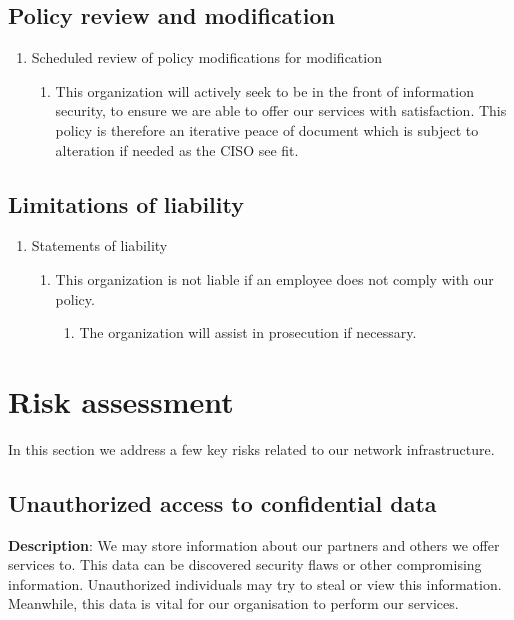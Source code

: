 \subsection{Policy review and modification}

\begin{enumerate}
  \item Scheduled review of policy modifications for modification
  \begin{enumerate}
    \item This organization will actively seek to be in the front of information security, to ensure we are able to offer our services with satisfaction. This policy is therefore an iterative peace of document which is subject to alteration if needed as the CISO see fit.
  \end{enumerate}
\end{enumerate}

\subsection{Limitations of liability}

\begin{enumerate}
  \item Statements of liability
  \begin{enumerate}
    \item This organization is not liable if an employee does not comply with our policy.
    \begin{enumerate}
      \item The organization will assist in prosecution if necessary.
    \end{enumerate}
  \end{enumerate}
\end{enumerate}


\section{Risk assessment}

In this section we address a few key risks related to our network infrastructure.

\subsection{Unauthorized access to confidential data}

\textbf{Description}: We may store information about our partners and others we offer services to. This data can be discovered security flaws or other compromising information. Unauthorized individuals may try to steal or view this information. Meanwhile, this data is vital for our organisation to perform our services. 

